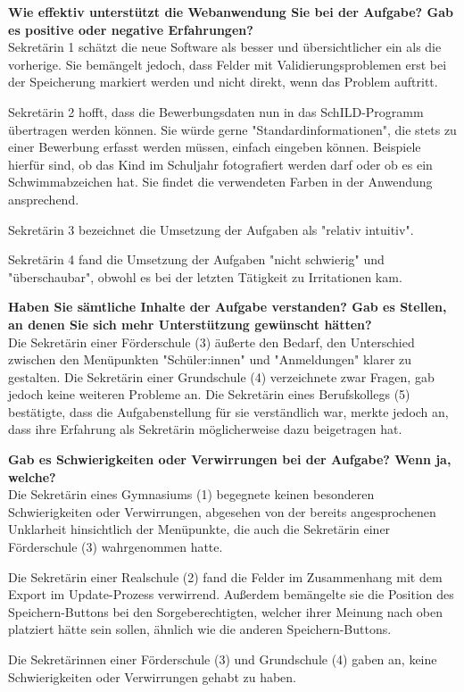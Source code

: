 \textbf{Wie effektiv unterstützt die Webanwendung Sie bei der Aufgabe?  Gab es positive oder negative Erfahrungen?}\\
Sekretärin 1 schätzt die neue Software als besser und übersichtlicher ein als die vorherige. Sie bemängelt jedoch, dass Felder mit Validierungsproblemen erst bei der Speicherung markiert werden und nicht direkt, wenn das Problem auftritt.

Sekretärin 2 hofft, dass die Bewerbungsdaten nun in das SchILD-Programm übertragen werden können. Sie würde gerne "Standardinformationen", die stets zu einer Bewerbung erfasst werden müssen, einfach eingeben können. Beispiele hierfür sind, ob das Kind im Schuljahr fotografiert werden darf oder ob es ein Schwimmabzeichen hat. Sie findet die verwendeten Farben in der Anwendung ansprechend.

Sekretärin 3 bezeichnet die Umsetzung der Aufgaben als "relativ intuitiv".

Sekretärin 4 fand die Umsetzung der Aufgaben "nicht schwierig" und "überschaubar", obwohl es bei der letzten Tätigkeit zu Irritationen kam.

\textbf{Haben Sie sämtliche Inhalte der Aufgabe verstanden? Gab es Stellen, an denen Sie sich mehr Unterstützung gewünscht hätten?}\\
Die Sekretärin einer Förderschule (3) äußerte den Bedarf, den Unterschied zwischen den Menüpunkten "Schüler:innen" und "Anmeldungen" klarer zu gestalten. Die Sekretärin einer Grundschule (4) verzeichnete zwar Fragen, gab jedoch keine weiteren Probleme an. Die Sekretärin eines Berufskollegs (5) bestätigte, dass die Aufgabenstellung für sie verständlich war, merkte jedoch an, dass ihre Erfahrung als Sekretärin möglicherweise dazu beigetragen hat.

\textbf{Gab es Schwierigkeiten oder Verwirrungen bei der Aufgabe? Wenn ja, welche?}\\
Die Sekretärin eines Gymnasiums (1) begegnete keinen besonderen Schwierigkeiten oder Verwirrungen, abgesehen von der bereits angesprochenen Unklarheit hinsichtlich der Menüpunkte, die auch die Sekretärin einer Förderschule (3) wahrgenommen hatte.

Die Sekretärin einer Realschule (2) fand die Felder im Zusammenhang mit dem Export im Update-Prozess verwirrend. Außerdem bemängelte sie die Position des Speichern-Buttons bei den Sorgeberechtigten, welcher ihrer Meinung nach oben platziert hätte sein sollen, ähnlich wie die anderen Speichern-Buttons.

Die Sekretärinnen einer Förderschule (3) und Grundschule (4) gaben an, keine Schwierigkeiten oder Verwirrungen gehabt zu haben.

